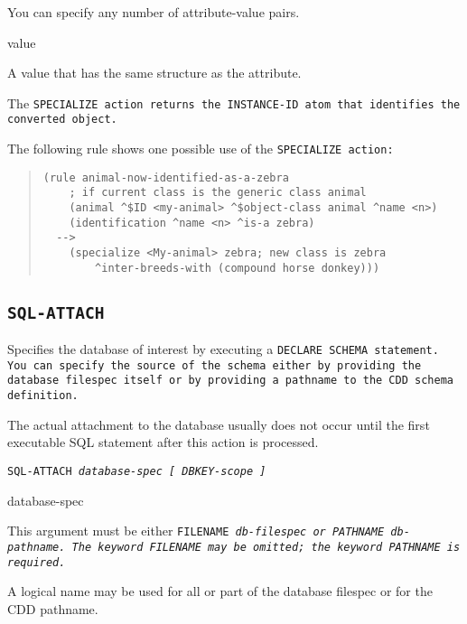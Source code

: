 {{\begin{arguments}
  You can specify any number of attribute-value pairs.

\item[value]

  A value that has the same structure as the attribute.
\end{arguments}

\ReturnValue

The \tt{SPECIALIZE} action returns the \tt{INSTANCE-ID} atom that
identifies the converted object.

\Example

The following rule shows one possible use of the \tt{SPECIALIZE}
action:

\begin{quote}
\begin{verbatim}
(rule animal-now-identified-as-a-zebra
    ; if current class is the generic class animal
    (animal ^$ID <my-animal> ^$object-class animal ^name <n>)
    (identification ^name <n> ^is-a zebra)
  -->
    (specialize <My-animal> zebra; new class is zebra
        ^inter-breeds-with (compound horse donkey)))
\end{verbatim}
\end{quote}

\subsection{\tt{SQL-ATTACH}}

Specifies the database of interest by executing a \tt{DECLARE SCHEMA}
statement. You can specify the source of the schema either by
providing the database filespec itself or by providing a pathname to
the CDD schema definition.

\begin{note}
  The actual attachment to the database usually does not occur until
  the first executable SQL statement after this action is processed.
\end{note}

\Format

\tt{SQL-ATTACH} \it{database-spec} [ \it{DBKEY-scope} ]

\begin{arguments}
\item[database-spec]

  This argument must be either \tt{FILENAME} \it{db-filespec} or
  \tt{PATHNAME} \it{db-pathname}. The keyword \tt{FILENAME} may be
  omitted; the keyword \tt{PATHNAME} is required.

  A logical name may be used for all or part of the database filespec
  or for the CDD pathname.


\end{arguments}}}
